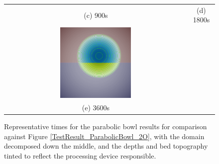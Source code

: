 \begin{figure}[tpb]
\begin{tabular}{cc}
		(c) 900s &
		(d) 1800s \\[6pt]
		\includegraphics[width=0.4\textwidth]{decomposition-test-figures/parabolic-bowl-2O-2D-depth-3600s.png} &
		\\
		(e) 3600s &
	\end{tabular}
	\caption{Representative times for the parabolic bowl results for comparison against Figure \ref{TestResult_ParabolicBowl_2O}, with the domain decomposed down the middle, and the depths and bed topography tinted to reflect the processing device responsible.}
	\label{TestResult_ParabolicBowl_2O_Decomposed2}
\end{figure}
